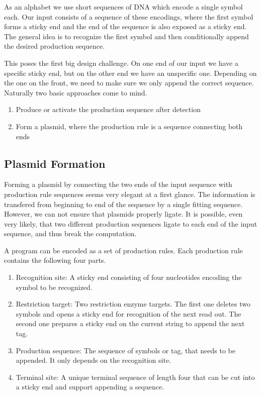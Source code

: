 \documentclass[
11pt, %
a4paper, %
oneside, %
headinclude,footinclude, %
BCOR5mm, %
]{scrartcl}
\begin{document}
As an alphabet we use short sequences of DNA which encode a single symbol each.
Our input consists of a sequence of these encodings, where the first symbol
forms a sticky end and the end of the sequence is also exposed as a sticky end.
The general idea is to recognize the first symbol and then conditionally append
the desired production sequence.

This poses the first big design challenge. On one end of our input we have a
specific sticky end, but on the other end we have an unspecific one. Depending
on the one on the front, we need to make sure we only append the correct
sequence. Naturally two basic approaches come to mind.

\begin{enumerate}
  \item Produce or activate the production sequence after detection
  \item Form a plasmid, where the production rule is a sequence connecting both
    ends
\end{enumerate}

\subsection{Plasmid Formation}

Forming a plasmid by connecting the two ends of the input sequence with
production rule sequences seems very elegant at a first glance. The information
is transfered from beginning to end of the sequence by a single fitting
sequence. However, we can not ensure that plasmids properly ligate. It is
possible, even very likely, that two different production sequences ligate to
each end of the input sequence, and thus break the computation.

A program can be encoded as a set of production rules. Each production rule
contains the following four parts.

 \begin{enumerate}
   \item Recognition site: A sticky end consisting of four nucleotides encoding
     the symbol to be recognized.
   \item Restriction target: Two restriction enzyme targets. The first one
     deletes two symbols and opens a sticky end for recognition of the next
     read out. The second one prepares a sticky end on the current string to
     append the next tag.
   \item Production sequence: The sequence of symbols or tag, that needs to be
     appended. It only depends on the recognition site.
   \item Terminal site: A unique terminal sequence of length four that can be cut
     into a sticky end and support appending a sequence.
 \end{enumerate}
\end{document}
